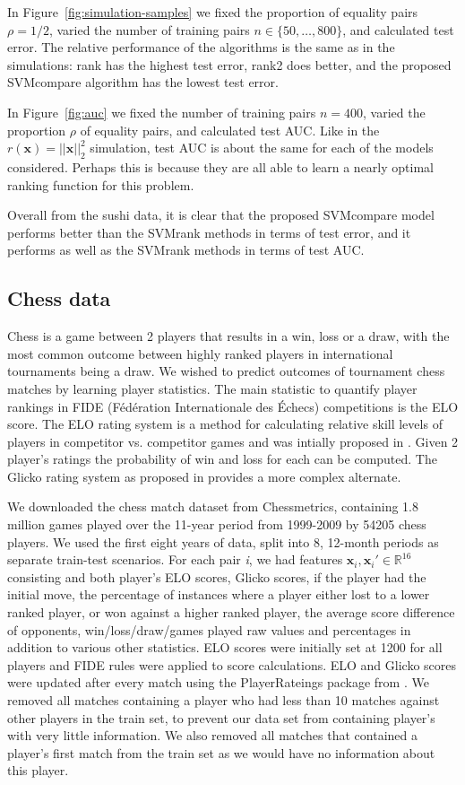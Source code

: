 \documentclass[twoside,11pt]{article}
\newcommand{\changed}[1]{
  #1
}
\newcommand{\RR}{\mathbb R}
\begin{document}
In Figure~\ref{fig:simulation-samples} we fixed the proportion of
equality pairs $\rho=1/2$, varied the number of training pairs
$n\in\{50,\dots, 800\}$, and calculated test error. The relative
performance of the algorithms is the same as in the simulations: rank
has the highest test error, rank2 does better, and the proposed
SVMcompare algorithm has the lowest test error.

In Figure~\ref{fig:auc} we fixed the number of training pairs $n=400$,
varied the proportion $\rho$ of equality pairs, and calculated test
AUC. \changed{Like in the $r(\mathbf x)=||\mathbf x||_2^2$ simulation,
  test AUC is about the same for each of the models
  considered. Perhaps this is because they are all able to learn a
  nearly optimal ranking function for this problem.}

\changed{Overall from the sushi data, it is clear that the proposed SVMcompare
model performs better than the SVMrank methods in terms of test error,
and it performs as well as the SVMrank methods in terms of test AUC.
}

\subsection{Chess data}
Chess is a game between 2 players that results in a win, loss or a draw, with the most common outcome between highly ranked players in international tournaments being a draw.  We wished to predict outcomes of tournament chess matches by learning player statistics.  The main statistic to quantify player rankings in FIDE (Fédération Internationale des Échecs) competitions is the ELO score.  The ELO rating system is a method for calculating relative skill levels of players in competitor vs. competitor games and was intially proposed in \citet{elo_score}.  Given 2 player's ratings the probability of win and loss for each can be computed.  The Glicko rating system as proposed in \citet{GLICKO} provides a more complex alternate.

We downloaded the chess match dataset from Chessmetrics, containing 1.8 million games played over the 11-year period from 1999-2009 by 54205 chess players.  We used the first eight years of data, split into 8, 12-month periods as separate train-test scenarios.  For each pair \textit{i}, we had features $\mathbf x_i,\mathbf
x_i'\in\RR^{16}$ 
consisting and both player's ELO scores, Glicko scores, if the player had the initial move, the percentage of instances where a player either lost to a lower ranked player, or won against a higher ranked player, the average score difference of opponents, win/loss/draw/games played raw values and percentages in addition to various other statistics.  ELO scores were initially set at 1200 for all players and FIDE rules were applied to score calculations.  ELO and Glicko scores were updated after every match using the PlayerRateings package from \citet{play-raitings}.  We removed all matches containing a player who had less than 10 matches against other players in the train set, to prevent our data set from containing player's with very little information.   We also removed all matches that contained a player's first match from the train set as we would have no information about this player.
\end{document}
